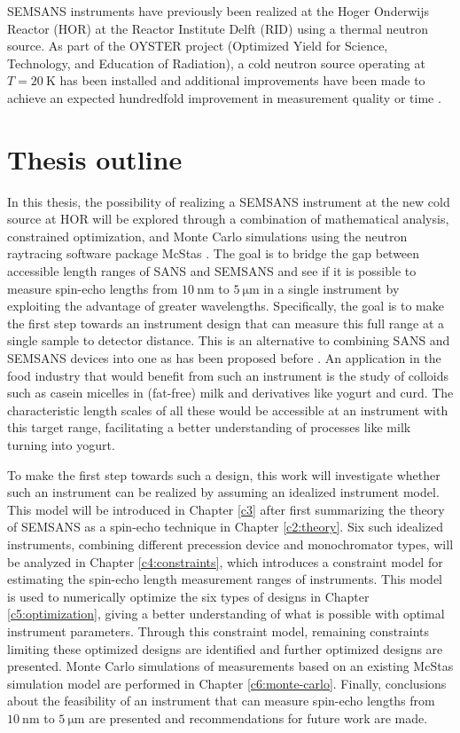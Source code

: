 SEMSANS instruments have previously been realized at the Hoger Onderwijs Reactor (HOR) at the Reactor Institute Delft (RID) using a thermal neutron source. As part of the OYSTER project (Optimized Yield for Science, Technology, and Education of Radiation), a cold neutron source operating at $T=\SI{20}{\kelvin}$ has been installed and additional improvements have been made to achieve an expected hundredfold improvement in measurement quality or time \cite{OYSTER2008}.

\section{Thesis outline}
\label{c1.3}
In this thesis, the possibility of realizing a SEMSANS instrument at the new cold source at HOR will be explored through a combination of mathematical analysis, constrained optimization, and Monte Carlo simulations using the neutron raytracing software package McStas \cite{willendrup2020}. The goal is to bridge the gap between accessible length ranges of SANS and SEMSANS \cite{bouwman2021} and see if it is possible to measure spin-echo lengths from $\SI{10}{\nano\meter}$ to $\SI{5}{\micro\meter}$ in a single instrument by exploiting the advantage of greater wavelengths. Specifically, the goal is to make the first step towards an instrument design that can measure this full range at a single sample to detector distance. This is an alternative to combining SANS and SEMSANS devices into one as has been proposed before \cite{bouwman2011}\cite{kusmin2017}. An application in the food industry that would benefit from such an instrument is the study of colloids such as casein micelles in (fat-free) milk and derivatives like yogurt and curd. The characteristic length scales of all these would be accessible at an instrument with this target range, facilitating a better understanding of processes like milk turning into yogurt. 

To make the first step towards such a design, this work will investigate whether such an instrument can be realized by assuming an idealized instrument model. This model will be introduced in Chapter \ref{c3} after first summarizing the theory of SEMSANS as a spin-echo technique in Chapter \ref{c2:theory}. Six such idealized instruments, combining different precession device and monochromator types, will be analyzed in Chapter \ref{c4:constraints}, which introduces a constraint model for estimating the spin-echo length measurement ranges of instruments. This model is used to numerically optimize the six types of designs in Chapter \ref{c5:optimization}, giving a better understanding of what is possible with optimal instrument parameters. Through this constraint model, remaining constraints limiting these optimized designs are identified and further optimized designs are presented. Monte Carlo simulations of measurements based on an existing McStas simulation model \cite{bouwman2021b} are performed in Chapter \ref{c6:monte-carlo}. Finally, conclusions about the feasibility of an instrument that can measure spin-echo lengths from $\SI{10}{\nano\meter}$ to $\SI{5}{\micro\meter}$ are presented and recommendations for future work are made.